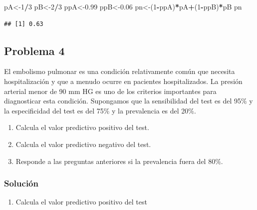 \documentclass[
]{article}
\newenvironment{Shaded}{\begin{snugshade}}{\end{snugshade}}
\newcommand{\DecValTok}[1]{\textcolor[rgb]{0.00,0.00,0.81}{#1}}
\newcommand{\FloatTok}[1]{\textcolor[rgb]{0.00,0.00,0.81}{#1}}
\newcommand{\NormalTok}[1]{#1}
\newcommand{\OtherTok}[1]{\textcolor[rgb]{0.56,0.35,0.01}{#1}}
\newcommand{\SpecialCharTok}[1]{\textcolor[rgb]{0.81,0.36,0.00}{\textbf{#1}}}
\providecommand{\tightlist}{%
  \setlength{\itemsep}{0pt}\setlength{\parskip}{0pt}}
\begin{document}
\begin{Shaded}
\begin{Highlighting}[]
\NormalTok{pA}\OtherTok{\textless{}{-}}\DecValTok{1}\SpecialCharTok{/}\DecValTok{3}
\NormalTok{pB}\OtherTok{\textless{}{-}}\DecValTok{2}\SpecialCharTok{/}\DecValTok{3}
\NormalTok{ppA}\OtherTok{\textless{}{-}}\FloatTok{0.99}
\NormalTok{ppB}\OtherTok{\textless{}{-}}\FloatTok{0.06}
\NormalTok{pn}\OtherTok{\textless{}{-}}\NormalTok{(}\DecValTok{1}\SpecialCharTok{{-}}\NormalTok{ppA)}\SpecialCharTok{*}\NormalTok{pA}\SpecialCharTok{+}\NormalTok{(}\DecValTok{1}\SpecialCharTok{{-}}\NormalTok{ppB)}\SpecialCharTok{*}\NormalTok{pB}
\NormalTok{pn}
\end{Highlighting}
\end{Shaded}

\begin{verbatim}
## [1] 0.63
\end{verbatim}

\subsection{Problema 4}\label{problema-4}

El embolismo pulmonar es una condición relativamente común que necesita hospitalización y que a menudo ocurre en pacientes hospitalizados. La presión arterial menor de 90 mm HG es uno de los criterios importantes para diagnosticar esta condición. Supongamos que la sensibilidad del test es del 95\% y la especificidad del test es del 75\% y la prevalencia es del 20\%.

\begin{enumerate}
\def\labelenumi{\alph{enumi})}
\item
  Calcula el valor predictivo positivo del test.
\item
  Calcula el valor predictivo negativo del test.
\item
  Responde a las preguntas anteriores si la prevalencia fuera del \(80 \%\).
\end{enumerate}

\subsubsection{Solución}\label{soluciuxf3n-3}

\begin{enumerate}
\def\labelenumi{\alph{enumi})}
\tightlist
\item
  Calcula el valor predictivo positivo del test
\end{enumerate}
\end{document}
